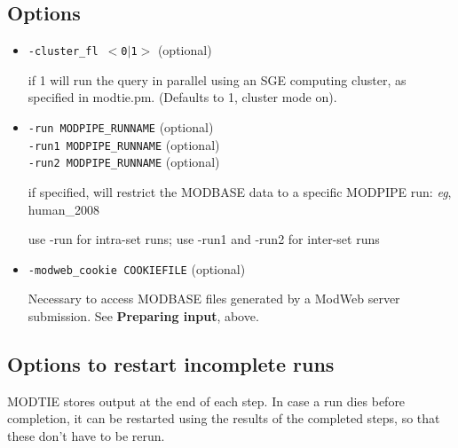 \documentclass[11pt]{article}
\begin{document}
\subsection{Options}

\begin{itemize}
\item {\tt -cluster\_fl $<$0$|$1$>$} (optional)

if 1 will run the query in parallel using an SGE computing cluster, as specified in modtie.pm. (Defaults to 1, cluster mode on).

\item {\tt-run MODPIPE\_RUNNAME} (optional)\\
{\tt -run1 MODPIPE\_RUNNAME} (optional)\\
{\tt -run2 MODPIPE\_RUNNAME} (optional)

if specified, will restrict the MODBASE data to a specific MODPIPE run: {\it eg}, human\_2008

use -run for intra-set runs; use -run1 and -run2 for inter-set runs

\item {\tt-modweb\_cookie COOKIEFILE} (optional)

Necessary to access MODBASE files generated by a ModWeb server submission. See {\bf Preparing input}, above.
\end{itemize}

\subsection{Options to restart incomplete runs}

MODTIE stores output at the end of each step. In case a run dies before completion, it can be restarted using the results of the completed steps, so that these don't have to be rerun.
\end{document}
